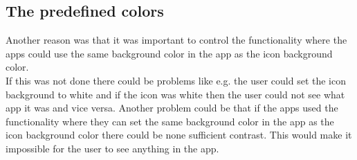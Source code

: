 \subsection{The predefined colors} 
\label{GUI:colors}


Another reason was that it was important to control the functionality where the apps could use the same background color in the app as the icon background color. \\
If this was not done there could be problems like e.g. the user could set the icon background to white and if the icon was white then the user could not see what app it was and vice versa. Another problem could be that if the apps used the functionality where they can set the same background color in the app as the icon background color there could be none sufficient contrast. This would make it impossible for the user to see anything in the app.

